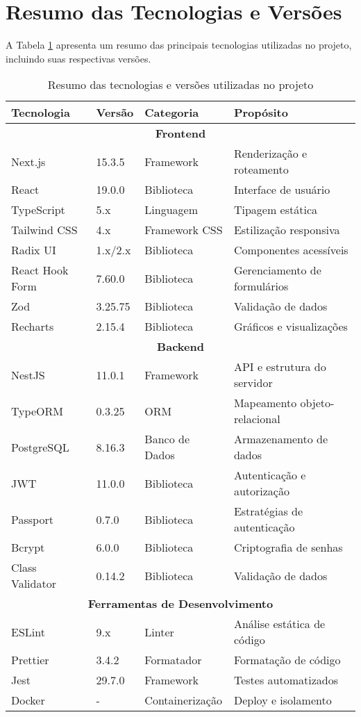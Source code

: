 \section{Resumo das Tecnologias e Versões}

A Tabela \ref{tab:tecnologias-versoes} apresenta um resumo das principais tecnologias utilizadas no projeto, incluindo suas respectivas versões.

\begin{table}[!htbp]
\centering
\small
\caption{Resumo das tecnologias e versões utilizadas no projeto}
\label{tab:tecnologias-versoes}
\begin{tabular}{|p{}|p{}|p{}|p{}|}
\hline
\textbf{Tecnologia} & \textbf{Versão} & \textbf{Categoria} & \textbf{Propósito} \\
\hline
\multicolumn{4}{|c|}{\textbf{Frontend}} \\
\hline
Next.js & 15.3.5 & Framework & Renderização e roteamento \\
\hline
React & 19.0.0 & Biblioteca & Interface de usuário \\
\hline
TypeScript & 5.x & Linguagem & Tipagem estática \\
\hline
Tailwind CSS & 4.x & Framework CSS & Estilização responsiva \\
\hline
Radix UI & 1.x/2.x & Biblioteca & Componentes acessíveis \\
\hline
React Hook Form & 7.60.0 & Biblioteca & Gerenciamento de formulários \\
\hline
Zod & 3.25.75 & Biblioteca & Validação de dados \\
\hline
Recharts & 2.15.4 & Biblioteca & Gráficos e visualizações \\
\hline
\multicolumn{4}{|c|}{\textbf{Backend}} \\
\hline
NestJS & 11.0.1 & Framework & API e estrutura do servidor \\
\hline
TypeORM & 0.3.25 & ORM & Mapeamento objeto-relacional \\
\hline
PostgreSQL & 8.16.3 & Banco de Dados & Armazenamento de dados \\
\hline
JWT & 11.0.0 & Biblioteca & Autenticação e autorização \\
\hline
Passport & 0.7.0 & Biblioteca & Estratégias de autenticação \\
\hline
Bcrypt & 6.0.0 & Biblioteca & Criptografia de senhas \\
\hline
Class Validator & 0.14.2 & Biblioteca & Validação de dados \\
\hline
\multicolumn{4}{|c|}{\textbf{Ferramentas de Desenvolvimento}} \\
\hline
ESLint & 9.x & Linter & Análise estática de código \\
\hline
Prettier & 3.4.2 & Formatador & Formatação de código \\
\hline
Jest & 29.7.0 & Framework & Testes automatizados \\
\hline
Docker & - & Containerização & Deploy e isolamento \\
\hline
\end{tabular}
\end{table}

